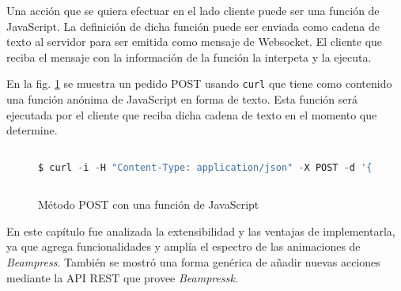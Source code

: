 		Una acción que se quiera efectuar en el lado cliente puede ser una función de JavaScript. La definición de dicha función puede ser enviada como cadena de texto al servidor para ser emitida como mensaje de Websocket. El cliente que reciba el mensaje con la información de la función la interpeta y la ejecuta. 

		En la fig. \ref{fig:java_post} se muestra un pedido POST usando \texttt{curl} que tiene como contenido una función anónima de JavaScript en forma de texto. Esta función será ejecutada por el cliente que reciba dicha cadena de texto en el momento que determine. 

			\begin{figure}[htb]%
				\begin{lstlisting}[language=Python]%

$ curl -i -H "Content-Type: application/json" -X POST -d '{"action":"function", "data":"var miFuncion = function(){/*Código que se quiera ejecutar*/};"}' http://beampressk.com:5000/action
  
				\end{lstlisting}
			\caption{Método POST con una función de JavaScript}
			\label{fig:java_post}
			\end{figure}		

	En este capítulo fue analizada la extensibilidad y las ventajas de implementarla, ya que agrega funcionalidades y amplía el espectro de las animaciones de \textit{Beampress}. También se mostró una forma genérica de añadir nuevas acciones mediante la API REST que provee \textit{Beampressk}.
	

